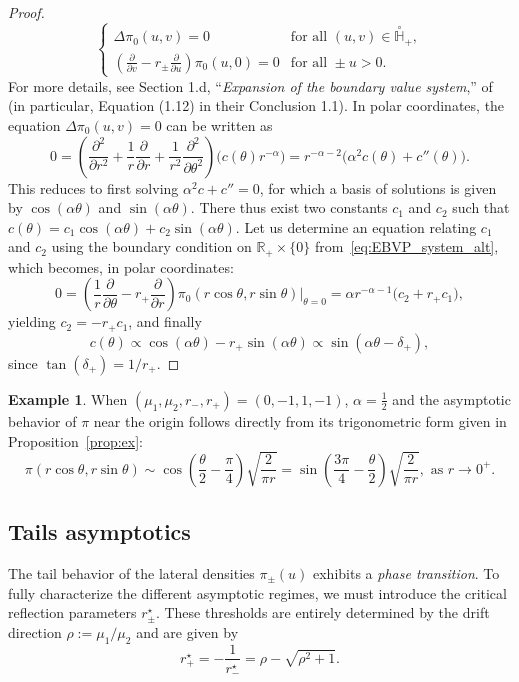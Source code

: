 \documentclass{article}
\theoremstyle{plain}
\theoremstyle{definition}
\newtheorem{example}[theorem]{Example}
\theoremstyle{remark}
\begin{document}
\begin{proof}
\begin{equation}
\left\{\begin{array}{ll}
\Delta\pi_0(u,v)=0 & \text{for all } (u,v)\in \overset{\circ}{\mathbb{H}}_+, \\[8pt]
\left(\displaystyle\frac{\partial}{\partial v}-r_\pm\frac{\partial}{\partial u}\right)\pi_0(u,0)=0&\text{for all }\pm u>0.
\end{array}\right.
\end{equation}
For more details, see Section 1.d, ``\textit{Expansion of the boundary value system},'' of~\cite{Costabel_Dauge_1993} (in particular, Equation (1.12) in their Conclusion 1.1). In polar coordinates, the equation $\Delta\pi_0(u,v)=0$ can be written as
$$0=\left(\frac{\partial^2}{\partial r^2}+\frac{1}{r}\frac{\partial}{\partial r}+\frac{1}{r^2}\frac{\partial^2}{\partial \theta^2}\right)\big(c(\theta)r^{-\alpha}\big)=r^{-\alpha-2}\big(\alpha^2 c(\theta)+c''(\theta)\big).$$
This reduces to first solving $\alpha^2c+c''=0$, for which a basis of solutions is given by $\cos(\alpha \theta)$ and $\sin(\alpha\theta)$. There thus exist two constants $c_1$ and $c_2$ such that $c(\theta)=c_1\cos(\alpha\theta)+c_2\sin(\alpha\theta)$. Let us determine an equation relating $c_1$ and $c_2$ using the boundary condition on $\mathbb R_+\times \{0\}$ from~\eqref{eq:EBVP_system_alt}, which becomes, in polar coordinates:
$$0=\left(\frac{1}{r}\frac{\partial}{\partial \theta}-r_+\frac{\partial}{\partial r}\right) \pi_0(r\cos\theta,r\sin\theta)\Big|_{\theta=0}=\alpha r^{-\alpha-1}\big(c_2+r_+c_1\big),$$
yielding $c_2=-r_+c_1$, and finally
$$c(\theta)\propto \cos(\alpha\theta)-r_+\sin(\alpha\theta)\propto \sin(\alpha\theta-\delta_+),$$
since $\tan(\delta_+)=1/r_+$.
\end{proof}

\begin{example} When $(\mu_1,\mu_2,r_-,r_+)=(0,-1,1,-1)$, $\alpha=\frac{1}{2}$ and the asymptotic behavior of $\pi$ near the origin follows directly from its trigonometric form given in Proposition~\ref{prop:ex}:
$$\pi(r\cos \theta,r\sin\theta)\sim \cos\left(\frac{\theta}{2}-\frac{\pi}{4}\right)\sqrt{\frac{2}{\pi r}}=\sin\left(\frac{3\pi}{4}-\frac{\theta}{2}\right)\sqrt{\frac{2}{\pi r}},\text{ as }r\to 0^+.$$
\end{example}

\subsection{Tails asymptotics}

The tail behavior of the lateral densities $\pi_\pm(u)$ exhibits a \textit{phase transition}. To fully characterize the different asymptotic regimes, we must introduce the critical reflection parameters $r_\pm^\star$. These thresholds are entirely determined by the drift direction $\rho:=\mu_1/\mu_2$ and are given by
$$r_+^\star=-\frac{1}{r_-^\star}=\rho-\sqrt{\rho^2+1}.$$
\end{document}
